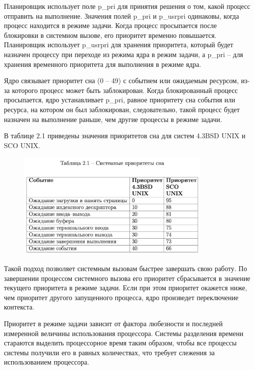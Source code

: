 Планировщик использует поле p\_pri для принятия решения о том, какой процесс отправить на выполнение. Значения полей p\_pri и p\_usrpri одинаковы, когда процесс находится в режиме задачи. Когда процесс просыпается после блокировки в системном вызове, его приоритет временно повышается. Планировщик использует p\_usrpri для хранения приоритета, который будет назначен процессу при переходе из режима ядра в режим задачи, а p\_pri – для хранения временного приоритета для выполнения в режиме ядра.

Ядро связывает приоритет сна (0 -- 49) с событием или ожидаемым ресурсом, из-за которого процесс может быть заблокирован. Когда блокированный процесс просыпается, ядро устанавливает p\_pri, равное приоритету сна события или ресурса, на котором он был заблокирован, следовательно, такой процесс будет назначен на выполнение раньше, чем другие процессы в режиме задачи.

В таблице 2.1 приведены значения приоритетов сна для систем 4.3BSD UNIX и SCO UNIX. 

\begin{figure}[h!]
	\centering
	\includegraphics[scale=1.0, width=0.85\textwidth]{assets/table}
\end{figure}

Такой подход позволяет системным вызовам быстрее завершать свою работу. По завершении процессом системного вызова его приоритет сбрасывается в значение текущего приоритета в режиме задачи. Если при этом приоритет окажется ниже, чем приоритет другого запущенного процесса, ядро произведет переключение контекста.

Приоритет в режиме задачи зависит от фактора любезности и последней измеренной величины использования процессора. 
Системы разделения времени стараются выделить процессорное время таким образом, чтобы все процессы системы получили его в равных количествах, что требует слежения за использованием процессора.

